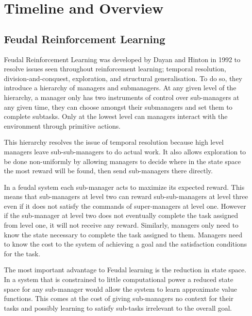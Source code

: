 \section{Timeline and Overview}

\subsection{Feudal Reinforcement Learning}

\par Feudal Reinforcement Learning was developed by Dayan and Hinton in 1992 to resolve issues seen throughout reinforcement learning; temporal resolution, division-and-conquest, exploration, and structural generalisation. To do so, they introduce a hierarchy of managers and submanagers. At any given level of the hierarchy, a manager only has two instruments of control over sub-managers at any given time, they can choose amongst their submanagers and set them to complete subtasks. Only at the lowest level can managers interact with the environment through primitive actions.

\par This hierarchy resolves the issue of temporal resolution because high level managers leave sub-sub-managers to do actual work. It also allows exploration to be done non-uniformly by allowing managers to decide where in the state space the most reward will be found, then send sub-managers there directly.

\par In a feudal system each sub-manager acts to maximize its expected reward. This means that sub-managers at level two can reward sub-sub-managers at level three even if it does not satisfy the commands of super-managers at level one. However if the sub-manager at level two does not eventually complete the task assigned from level one, it will not receive any reward. Similarly, managers only need to know the state necessary to complete the task assigned to them. Managers need to know the cost to the system of achieving a goal and the satisfaction conditions for the task. 

\par The most important advantage to Feudal learning is the reduction in state space. In a system that is constrained to little computational power a reduced state space for any sub-manager would allow the system to learn approximate value functions. This comes at the cost of giving sub-managers no context for their tasks and possibly learning to satisfy sub-tasks irrelevant to the overall goal.

